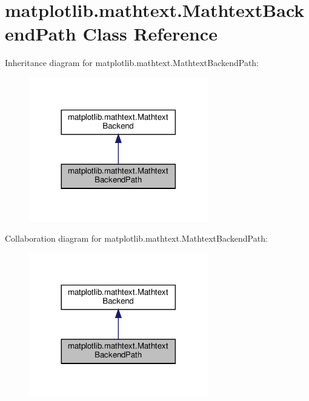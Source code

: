 \hypertarget{classmatplotlib_1_1mathtext_1_1MathtextBackendPath}{}\section{matplotlib.\+mathtext.\+Mathtext\+Backend\+Path Class Reference}
\label{classmatplotlib_1_1mathtext_1_1MathtextBackendPath}


Inheritance diagram for matplotlib.\+mathtext.\+Mathtext\+Backend\+Path\+:
\nopagebreak
\begin{figure}[H]
\begin{center}
\leavevmode
\includegraphics[width=221pt]{classmatplotlib_1_1mathtext_1_1MathtextBackendPath__inherit__graph}
\end{center}
\end{figure}


Collaboration diagram for matplotlib.\+mathtext.\+Mathtext\+Backend\+Path\+:
\nopagebreak
\begin{figure}[H]
\begin{center}
\leavevmode
\includegraphics[width=221pt]{classmatplotlib_1_1mathtext_1_1MathtextBackendPath__coll__graph}
\end{center}
\end{figure}
